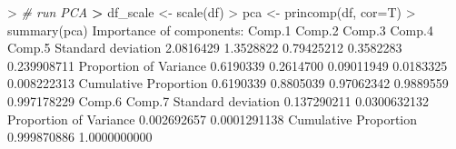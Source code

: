 \documentclass[
]{article}
\newenvironment{Shaded}{\begin{snugshade}}{\end{snugshade}}
\newcommand{\AttributeTok}[1]{\textcolor[rgb]{0.77,0.63,0.00}{#1}}
\newcommand{\CommentTok}[1]{\textcolor[rgb]{0.56,0.35,0.01}{\textit{#1}}}
\newcommand{\DecValTok}[1]{\textcolor[rgb]{0.00,0.00,0.81}{#1}}
\newcommand{\ErrorTok}[1]{\textcolor[rgb]{0.64,0.00,0.00}{\textbf{#1}}}
\newcommand{\FloatTok}[1]{\textcolor[rgb]{0.00,0.00,0.81}{#1}}
\newcommand{\FunctionTok}[1]{\textcolor[rgb]{0.00,0.00,0.00}{#1}}
\newcommand{\NormalTok}[1]{#1}
\newcommand{\OtherTok}[1]{\textcolor[rgb]{0.56,0.35,0.01}{#1}}
\newcommand{\SpecialCharTok}[1]{\textcolor[rgb]{0.00,0.00,0.00}{#1}}
\begin{document}
\begin{Shaded}
\end{Shaded}

\begin{Shaded}
\begin{Highlighting}[]
\SpecialCharTok{\textgreater{}} \CommentTok{\# run PCA}
\ErrorTok{\textgreater{}}\NormalTok{ df\_scale }\OtherTok{\textless{}{-}} \FunctionTok{scale}\NormalTok{(df)}
\SpecialCharTok{\textgreater{}}\NormalTok{ pca }\OtherTok{\textless{}{-}} \FunctionTok{princomp}\NormalTok{(df, }\AttributeTok{cor=}\NormalTok{T)}
\SpecialCharTok{\textgreater{}} \FunctionTok{summary}\NormalTok{(pca)}
\NormalTok{Importance of components}\SpecialCharTok{:}
\NormalTok{                          Comp}\FloatTok{.1}\NormalTok{    Comp}\FloatTok{.2}\NormalTok{     Comp}\FloatTok{.3}\NormalTok{    Comp}\FloatTok{.4}\NormalTok{      Comp}\FloatTok{.5}
\NormalTok{Standard deviation     }\FloatTok{2.0816429} \FloatTok{1.3528822} \FloatTok{0.79425212} \FloatTok{0.3582283} \FloatTok{0.239908711}
\NormalTok{Proportion of Variance }\FloatTok{0.6190339} \FloatTok{0.2614700} \FloatTok{0.09011949} \FloatTok{0.0183325} \FloatTok{0.008222313}
\NormalTok{Cumulative Proportion  }\FloatTok{0.6190339} \FloatTok{0.8805039} \FloatTok{0.97062342} \FloatTok{0.9889559} \FloatTok{0.997178229}
\NormalTok{                            Comp}\FloatTok{.6}\NormalTok{       Comp}\FloatTok{.7}
\NormalTok{Standard deviation     }\FloatTok{0.137290211} \FloatTok{0.0300632132}
\NormalTok{Proportion of Variance }\FloatTok{0.002692657} \FloatTok{0.0001291138}
\NormalTok{Cumulative Proportion  }\FloatTok{0.999870886} \FloatTok{1.0000000000}
\end{Highlighting}
\end{Shaded}
\end{document}
